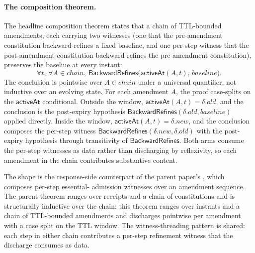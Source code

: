 \paragraph{The composition theorem.}
The headline composition theorem
 states that a
chain of TTL-bounded amendments, each carrying two witnesses (one
that the pre-amendment constitution backward-refines a fixed baseline,
and one per-step witness that the post-amendment constitution
backward-refines the pre-amendment constitution), preserves the
baseline at every instant:
\[
  \forall t,\, \forall A \in \mathit{chain},\
    \mathsf{BackwardRefines}\bigl(\mathsf{activeAt}(A, t),\, \mathit{baseline}\bigr).
\]
The conclusion is pointwise over $A \in \mathit{chain}$ under a
universal quantifier, not inductive over an evolving state. For each
amendment $A$, the proof case-splits on the $\mathsf{activeAt}$
conditional. Outside the window,
$\mathsf{activeAt}(A, t) = \delta.\mathit{old}$, and the conclusion is
the post-expiry hypothesis
$\mathsf{BackwardRefines}(\delta.\mathit{old}, \mathit{baseline})$
applied directly. Inside the window,
$\mathsf{activeAt}(A, t) = \delta.\mathit{new}$, and the conclusion
composes the per-step witness
$\mathsf{BackwardRefines}(\delta.\mathit{new}, \delta.\mathit{old})$
with the post-expiry hypothesis through transitivity of
$\mathsf{BackwardRefines}$. Both arms consume the per-step witnesses
as data rather than discharging by reflexivity, so each amendment in
the chain contributes substantive content.

The shape is the response-side counterpart of the parent paper's
\thm{essential_preserved_chain}, which composes per-step essential-
admission witnesses over an amendment sequence. The parent theorem
ranges over receipts and a chain of constitutions and is structurally
inductive over the chain; this theorem ranges over instants and a
chain of TTL-bounded amendments and discharges pointwise per amendment
with a case split on the TTL window. The witness-threading pattern is
shared: each step in either chain contributes a per-step refinement
witness that the discharge consumes as data.

